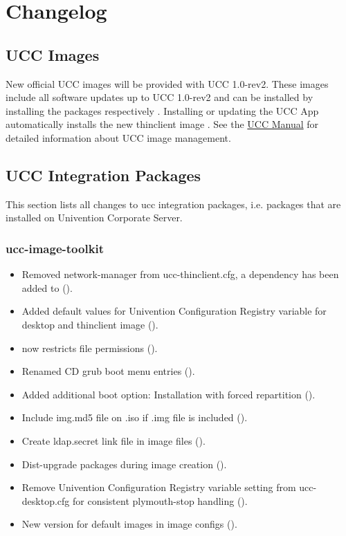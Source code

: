 \dominitoc
\tableofcontents
\newpage

\chapter{Changelog}
\newcommand{\ucsUCRV}[1]{Univention Configuration Registry variable \ucsCommand{\ucsBCindex{#1}}}
\newcommand{\ucsCVE}[1]{\href{http://security-tracker.debian.org/tracker/CVE-#1}{CVE-#1}}

\section{UCC Images}

New official UCC images will be provided with UCC 1.0-rev2. These images
include all software updates up to UCC 1.0-rev2 and can be installed by
installing the packages 
respectively . Installing or
updating the UCC App automatically installs the new thinclient image
. See the 
\href{http://docs.univention.de/ucc-manual-1.0.html#installation:imagemanagement}{UCC Manual}
for detailed information about UCC image management.

\section{UCC Integration Packages}
This section lists all changes to ucc integration packages, i.e. packages that are installed on Univention Corporate Server.
\subsection{ucc-image-toolkit}
\begin{itemize}
\item Removed network-manager from ucc-thinclient.cfg, a dependency has been added to  ().
\item Added default values for \ucsUCRV{ucc/mount} for desktop and thinclient image ().
\item {} now restricts file permissions ().
\item Renamed CD grub boot menu entries ().
\item Added additional boot option: Installation with forced repartition ().
\item Include img.md5 file on .iso if .img file is included ().
\item Create ldap.secret link file in image files ().
\item Dist-upgrade packages during image creation ().
\item Remove \ucsUCRV{kdm/autostart} setting from ucc-desktop.cfg for consistent plymouth-stop handling ().
\item New version for default images in image configs ().
\end{itemize}

